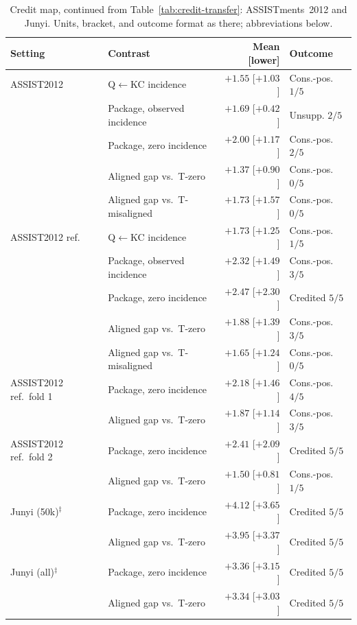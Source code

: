 \begin{table}[tbp]
\caption{Credit map, continued from Table~\ref{tab:credit-transfer}:
ASSISTments~2012 and Junyi. Units, bracket, and outcome format as there;
abbreviations below.}
\label{tab:credit-transfer-b}
\centering
\scriptsize
\setlength{\tabcolsep}{3pt}
\renewcommand{\arraystretch}{0.84}
\begin{tabular}{@{}llrl@{}}
\toprule
Setting & Contrast & Mean [lower] & Outcome \\
\midrule
ASSIST2012 & Q$\leftarrow$KC incidence & $+1.55$ [$+1.03$] & Cons.-pos. $1/5$ \\
 & Package, observed incidence & $+1.69$ [$+0.42$] & Unsupp. $2/5$ \\
 & Package, zero incidence & $+2.00$ [$+1.17$] & Cons.-pos. $2/5$ \\
 & Aligned gap vs.\ T-zero & $+1.37$ [$+0.90$] & Cons.-pos. $0/5$ \\
 & Aligned gap vs.\ T-misaligned & $+1.73$ [$+1.57$] & Cons.-pos. $0/5$ \\
\addlinespace[1pt]
ASSIST2012 ref. & Q$\leftarrow$KC incidence & $+1.73$ [$+1.25$] & Cons.-pos. $1/5$ \\
 & Package, observed incidence & $+2.32$ [$+1.49$] & Cons.-pos. $3/5$ \\
 & Package, zero incidence & $+2.47$ [$+2.30$] & Credited $5/5$ \\
 & Aligned gap vs.\ T-zero & $+1.88$ [$+1.39$] & Cons.-pos. $3/5$ \\
 & Aligned gap vs.\ T-misaligned & $+1.65$ [$+1.24$] & Cons.-pos. $0/5$ \\
\addlinespace[1pt]
ASSIST2012 ref.\ fold 1 & Package, zero incidence & $+2.18$ [$+1.46$] & Cons.-pos. $4/5$ \\
 & Aligned gap vs.\ T-zero & $+1.87$ [$+1.14$] & Cons.-pos. $3/5$ \\
\addlinespace[1pt]
ASSIST2012 ref.\ fold 2 & Package, zero incidence & $+2.41$ [$+2.09$] & Credited $5/5$ \\
 & Aligned gap vs.\ T-zero & $+1.50$ [$+0.81$] & Cons.-pos. $1/5$ \\
\addlinespace[1pt]
Junyi (50k)$^{\ddagger}$ & Package, zero incidence & $+4.12$ [$+3.65$] & Credited $5/5$ \\
 & Aligned gap vs.\ T-zero & $+3.95$ [$+3.37$] & Credited $5/5$ \\
\addlinespace[1pt]
Junyi (all)$^{\ddagger}$ & Package, zero incidence & $+3.36$ [$+3.15$] & Credited $5/5$ \\
 & Aligned gap vs.\ T-zero & $+3.34$ [$+3.03$] & Credited $5/5$ \\
\bottomrule
\end{tabular}


\end{table}

